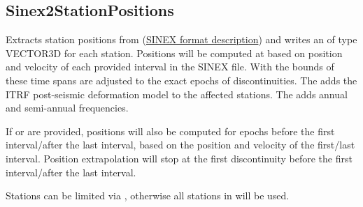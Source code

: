 \clearpage
\subsection{Sinex2StationPositions}\label{Sinex2StationPositions}
Extracts station positions from 
(\href{http://www.iers.org/IERS/EN/Organization/AnalysisCoordinator/SinexFormat/sinex.html}{SINEX format description})
and writes an  of type VECTOR3D
for each station.  Positions will be computed at  based on position and velocity
of each provided interval in the SINEX file.
With  the bounds of these time spans are adjusted to the exact epochs of discontinuities.
The  adds the ITRF post-seismic deformation model to the affected stations.
The  adds annual and semi-annual frequencies.

If  or  are provided, positions will also be computed for epochs
before the first interval/after the last interval, based on the position and velocity of the first/last interval.
Position extrapolation will stop at the first discontinuity before the first interval/after the last interval.

Stations can be limited via , otherwise all stations in  will be used.


